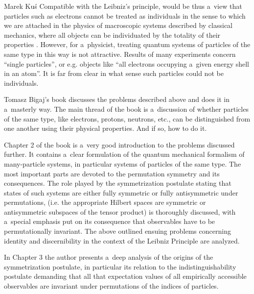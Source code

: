 \begin{newrevengenv}{Marek Kuś}
Compatible with the Leibniz's principle, would be thus a~view that particles such as electrons cannot be treated as individuals in the sense to which we are attached in the physics of macroscopic systems described by classical mechanics, where all objects can be individuated by the totality of their properties
\parencite[][]{redhead_particle_1992}. %
 However, for a~physicist, treating quantum systems of particles of the same type in this way is not attractive. Results of many experiments concern ``single particles'', or e.g. objects like ``all electrons occupying a~given energy shell in an atom''. It is far from clear in what sense such particles could not be individuals.

Tomasz Bigaj's book
\parencite[][]{bigaj_identity_2022} %
 discusses the problems described above and does it in a~masterly way. The main thread of the book is a~discussion of whether particles of the same type, like electrons, protons, neutrons, etc., can be distinguished from one another using their physical properties. And if so, how to do it.

Chapter 2 of the book is a~very good introduction to the problems discussed further. It contains a~clear formulation of the quantum mechanical formalism of many-particle systems, in particular systems of particles of the same type. The most important parts are devoted to the permutation symmetry and its consequences. The role played by the symmetrization postulate stating that states of such systems are either fully symmetric or fully antisymmetric under permutations, (i.e. the appropriate Hilbert spaces are symmetric or antisymmetric subspaces of the tensor product) is thoroughly discussed, with a~special emphasis put on its consequence that observables have to be permutationally invariant. The above outlined ensuing problems concerning identity and discernibility in the context of the Leibniz Principle are analyzed.

In Chapter 3 the author presents a~deep analysis of the origins of the symmetrization postulate, in particular its relation to the indistinguishability postulate demanding that all that expectation values of all empirically accessible observables are invariant under permutations of the indices of particles.


\end{newrevengenv}

